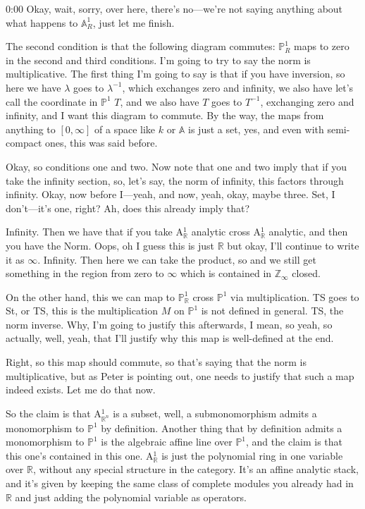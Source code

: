 \begin{unfinished}{0:00}
Okay, wait, sorry, over here, there's no---we're not saying anything about what happens to $\mathbb{A}^1_R$, just let me finish.

The second condition is that the following diagram commutes: $\mathbb{P}^1_R$ maps to zero in the second and third conditions. I'm going to try to say the norm is multiplicative. The first thing I'm going to say is that if you have inversion, so here we have $\lambda$ goes to $\lambda^{-1}$, which exchanges zero and infinity, we also have let's call the coordinate in $\mathbb{P}^1$ $T$, and we also have $T$ goes to $T^{-1}$, exchanging zero and infinity, and I want this diagram to commute. By the way, the maps from anything to $[0, \infty]$ of a space like $k$ or $\mathbb{A}$ is just a set, yes, and even with semi-compact ones, this was said before.

Okay, so conditions one and two. Now note that one and two imply that if you take the infinity section, so, let's say, the norm of infinity, this factors through infinity. Okay, now before I---yeah, and now, yeah, okay, maybe three. Set, I don't---it's one, right? Ah, does this already imply that?

Infinity. Then we have that if you take A$^1_{\mathbb{R}}$ analytic cross A$^1_{\mathbb{R}}$ analytic, and then you have the Norm. Oops, oh I guess this is just $\mathbb{R}$ but okay, I'll continue to write it as $\infty$. Infinity. Then here we can take the product, so and we still get something in the region from zero to $\infty$ which is contained in $\mathbb{Z}_{\infty}$ closed.

On the other hand, this we can map to $\mathbb{P}^1_{\mathbb{R}}$ cross $\mathbb{P}^1$ via multiplication. TS goes to St, or TS, this is the multiplication $M$ on $\mathbb{P}^1$ is not defined in general. TS, the norm inverse. Why, I'm going to justify this afterwards, I mean, so yeah, so actually, well, yeah, that I'll justify why this map is well-defined at the end.

Right, so this map should commute, so that's saying that the norm is multiplicative, but as Peter is pointing out, one needs to justify that such a map indeed exists. Let me do that now. 

So the claim is that A$^1_{\mathbb{R}^n}$ is a subset, well, a submonomorphism admits a monomorphism to $\mathbb{P}^1$ by definition. Another thing that by definition admits a monomorphism to $\mathbb{P}^1$ is the algebraic affine line over $\mathbb{P}^1$, and the claim is that this one's contained in this one. A$^1_{\mathbb{R}}$ is just the polynomial ring in one variable over $\mathbb{R}$, without any special structure in the category. It's an affine analytic stack, and it's given by keeping the same class of complete modules you already had in $\mathbb{R}$ and just adding the polynomial variable as operators.


\end{unfinished}
